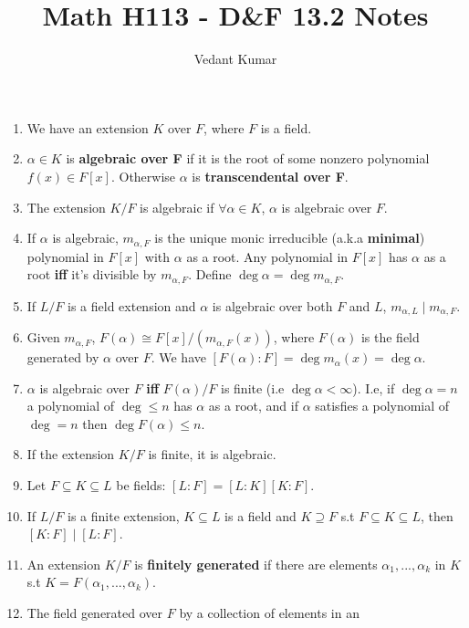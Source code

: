 \documentclass{article}
\title{Math H113 - D\&F 13.2 Notes}
\author{Vedant Kumar}
\begin{document}
\maketitle

\begin{enumerate}[1.]
    \item We have an extension $K$ over $F$, where $F$ is a field.
    \item $\alpha \in K$ is \textbf{algebraic over F} if it is the root of
        some nonzero polynomial $f(x) \in F[x]$. Otherwise $\alpha$ is
        \textbf{transcendental over F}.
    \item The extension $K/F$ is algebraic if $\forall \alpha \in K$,
        $\alpha$ is algebraic over $F$.
    \item If $\alpha$ is algebraic, $m_{\alpha, F}$ is the unique monic
        irreducible (a.k.a \textbf{minimal}) polynomial in $F[x]$ with
        $\alpha$ as a root. Any polynomial in $F[x]$ has $\alpha$ as a root
        \textbf{iff} it's divisible by $m_{\alpha, F}$. Define $\deg
        \alpha = \deg m_{\alpha, F}$.
    \item If $L/F$ is a field extension and $\alpha$ is algebraic over both
        $F$ and $L$, $m_{\alpha,L} \mid m_{\alpha,F}$.
    \item Given $m_{\alpha, F}$, $F(\alpha) \cong F[x]/(m_{\alpha, F}(x))$,
        where $F(\alpha)$ is the field generated by $\alpha$ over $F$. We
        have $[F(\alpha) : F] = \deg m_{\alpha}(x) = \deg \alpha$.
    \item $\alpha$ is algebraic over $F$ \textbf{iff} $F(\alpha)/F$ is
        finite (i.e $\deg \alpha < \infty$). I.e, if $\deg \alpha = n$ a
        polynomial of $\deg \leq n$ has $\alpha$ as a root, and if $\alpha$
        satisfies a polynomial of $\deg = n$ then $\deg F(\alpha) \leq n$.
    \item If the extension $K/F$ is finite, it is algebraic.
    \item Let $F \subseteq K \subseteq L$ be fields: $[L : F] = [L : K][K :
        F]$.
    \item If $L/F$ is a finite extension, $K \subseteq L$ is a field and $K
        \supseteq F$ s.t $F \subseteq K \subseteq L$, then $[K : F] \mid [L
        : F]$.
    \item An extension $K/F$ is \textbf{finitely generated} if there are
        elements $\alpha_1, ..., \alpha_k$ in $K$ s.t $K = F(\alpha_1, ...,
        \alpha_k)$.
    \item The field generated over $F$ by a collection of elements in an

\end{enumerate}
\end{document}
